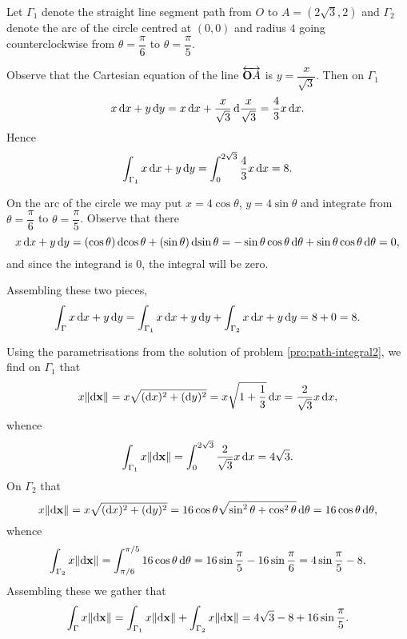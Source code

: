 \begin{Answer}{13.2}
Let $\Gamma _1$ denote the straight line segment path from $O$ to
$A=(2\sqrt{3},2)$ and $\Gamma _2$ denote the arc of the circle
centred at $(0,0)$ and radius $4$ going counterclockwise from
$\theta=\dfrac{\pi}{6}$ to  $\theta=\dfrac{\pi}{5}$.

\bigskip

Observe that the Cartesian equation of the line  $\overleftrightarrow{{\mathbf OA}}$ is $y
=\dfrac{x}{\sqrt{3}}$. Then on $\Gamma _1$
$$x\d{x} + y\d{y} = x\d{x}+ \dfrac{x}{\sqrt{3}}\d{\dfrac{x}{\sqrt{3}}} = \dfrac{4}{3}x\d{x}.$$
Hence $$\dint _{\Gamma _1} x\d{x} + y\d{y} = \dint _0 ^{2\sqrt{3}}
\dfrac{4}{3}x\d{x} = 8.
$$

On the arc of the circle we may put $x=4\cos \theta$, $y = 4\sin
\theta$ and integrate from $\theta = \dfrac{\pi}{6}$ to $\theta =
\dfrac{\pi}{5}$. Observe that there
$$ x\d{x} + y\d{y} = (\cos \theta )\d{\cos \theta}  +(\sin\theta)\d{\sin \theta} = -\sin\theta\cos\theta\d{\theta}+\sin\theta\cos\theta\d{\theta}=0,$$
and since the integrand is $0$, the integral will be zero.

\bigskip

Assembling these two pieces,
$$\dint _{\Gamma} x\d{x} + y\d{y} = \dint _{\Gamma _1} x\d{x} + y\d{y} +\dint _{\Gamma _2} x\d{x} + y\d{y}=8+0=8.    $$


\bigskip

Using the parametrisations from the solution of  problem
\ref{pro:path-integral2}, we find on $\Gamma _1$ that
$$ x\norm{\d{\point{x}}} = x\sqrt{(\d{x})^2+ (\d{y})^2} =x\sqrt{1+\dfrac{1}{3}}\d{x}=\dfrac{2}{\sqrt{3}}x\d{x},  $$
whence
$$ \dint _{\Gamma _1} x\norm{\d{\point{x}}} = \dint _0 ^{2\sqrt{3}}
\dfrac{2}{\sqrt{3}}x\d{x} = 4\sqrt{3}.  $$ On $\Gamma _2$ that
$$ x\norm{\d{\point{x}}} = x\sqrt{(\d{x})^2+ (\d{y})^2} =16\cos \theta\sqrt{\sin^2\theta + \cos^2\theta}\d{\theta}=16\cos\theta\d{\theta},  $$
whence
$$ \dint _{\Gamma _2} x\norm{\d{\point{x}}} = \dint _{\pi /6} ^{\pi /5}
16\cos\theta\d{\theta} = 16\sin \dfrac{\pi}{5} -16\sin
\dfrac{\pi}{6}= 4\sin \dfrac{\pi}{5}-8.
$$Assembling these we gather that
$$ \dint _{\Gamma } x\norm{\d{\point{x}}} =\dint _{\Gamma _1} x\norm{\d{\point{x}}}+\dint _{\Gamma _2}
x\norm{\d{\point{x}}}= 4\sqrt{3}-8+16\sin \dfrac{\pi}{5}.$$



\end{Answer}
